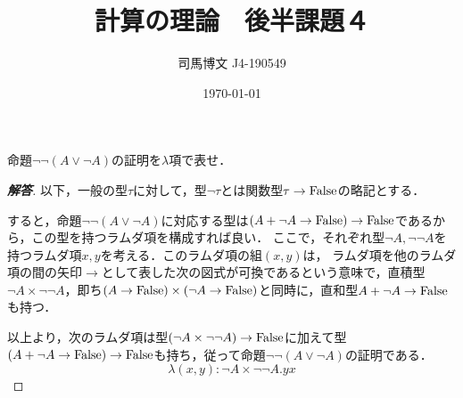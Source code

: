\documentclass[uplatex, dvipdfmx]{jsarticle}
\title{計算の理論　後半課題４}
\author{司馬博文 J4-190549}
\date{\today}
\begin{document}
\maketitle

\begin{question*}
    命題$\lnot \lnot (A\lor\lnot A)$の証明を$\lambda$項で表せ．
\end{question*}
\begin{proof}[\bf{解答}]
    以下，一般の型$\tau$に対して，型$\lnot\tau$とは関数型$\tau\to\mathrm{False}$の略記とする．

    すると，命題$\lnot \lnot (A\lor\lnot A)$に対応する型は$(A+\lnot A\to\mathrm{False})\to\mathrm{False}$であるから，この型を持つラムダ項を構成すれば良い．
    ここで，それぞれ型$\lnot A, \lnot\lnot A$を持つラムダ項$x,y$を考える．このラムダ項の組$(x,y)$は，
    ラムダ項を他のラムダ項の間の矢印$\to$として表した次の図式が可換であるという意味で，直積型$\lnot A\times \lnot\lnot A$，即ち$(A\to\mathrm{False})\times(\lnot A\to\mathrm{False})$と同時に，直和型$A+\lnot A\to\mathrm{False}$も持つ．
    \begin{center}
    \end{center}
    以上より，次のラムダ項は型$(\lnot A\times\lnot\lnot A)\to\mathrm{False}$に加えて型$(A+\lnot A\to\mathrm{False})\to\mathrm{False}$も持ち，従って命題$\lnot \lnot (A\lor\lnot A)$の証明である．
    \[ \lambda (x,y):\lnot A\times \lnot\lnot A.yx \]
\end{proof}

\end{document}
